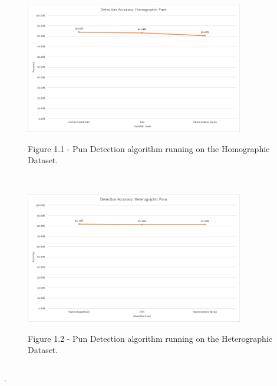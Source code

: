\documentclass[final]{beamer}
\newlength{\onecolwid}
\newlength{\twocolwid}
\begin{document}
\begin{frame}[t]
\begin{columns}[t]
\begin{column}{\twocolwid}
\begin{columns}[t,totalwidth=\twocolwid]
\begin{column}{\onecolwid}
\begin{figure}
\includegraphics[width=0.85\textwidth]{HomographicDetection.png}\\
\caption{Figure 1.1 - Pun Detection algorithm running on the Homographic Dataset.}
\end{figure}
\\
\vspace{20mm}
\begin{figure}
\includegraphics[width=0.85\textwidth]{HeterographicDetection.png}\\
\caption{Figure 1.2 - Pun Detection algorithm running on the Heterographic Dataset.}
\end{figure}



\end{column} %

\end{columns} %

\begin{block}
    {.}
\end{block}


\end{column}
\end{columns}
\end{frame}
\end{document}
